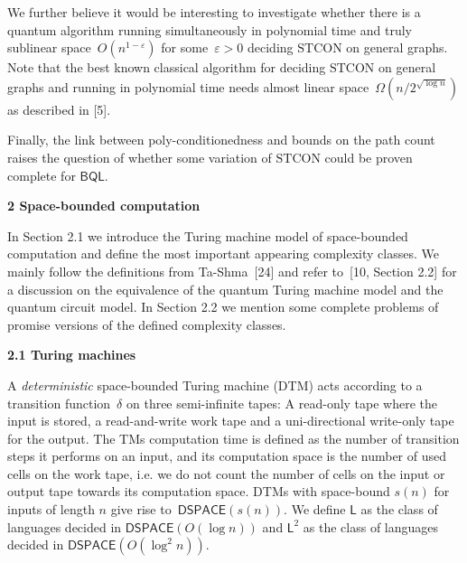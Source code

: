 We further believe it would be interesting to investigate whether there is a quantum algorithm running simultaneously in polynomial time and truly sublinear space $O(n^{1-\varepsilon})$ for some $\varepsilon>0$ deciding $\mathrm{STCON}$ on general graphs. Note that the best known classical algorithm for deciding $\mathrm{STCON}$ on general graphs and running in polynomial time needs almost linear space $\Omega(n/2^{\sqrt{\log n}})$ as described in [5].\par




Finally, the link between poly-conditionedness and bounds on the path count raises the question of whether some variation of $\mathrm{STCON}$ could be proven complete for $\mathsf{BQL}$.\par






\par\medskip\noindent\textbf{
2 Space-bounded computation}\par




In Section 2.1 we introduce the Turing machine model of space-bounded computation and define the most important appearing complexity classes.
We mainly follow the definitions from Ta-Shma [24] and refer to [10, Section 2.2] for a discussion on the equivalence of the quantum Turing machine model and the quantum circuit model.
In Section 2.2 we mention some complete problems of promise versions of the defined complexity classes.\par




\par\medskip\noindent\textbf{
2.1 Turing machines}\par




A \emph{deterministic} space-bounded Turing machine (DTM) acts according to a transition function $\delta$ on three semi-infinite tapes: A read-only tape where the input is stored, a read-and-write work tape and a uni-directional write-only tape for the output.
The TMs computation time is defined as the number of transition steps it performs on an input, and its computation space is the number of used cells on the work tape, i.e. we do not count the number of cells on the input or output tape towards its computation space.
DTMs with space-bound $s(n)$ for inputs of length $n$ give rise to $\mathsf{DSPACE}(s(n))$.
We define $\mathsf{L}$ as the class of languages decided in $\mathsf{DSPACE}(O(\log n))$ and $\mathsf{L}^{2}$ as the class of languages decided in $\mathsf{DSPACE}(O(\log^{2}n))$.\par




